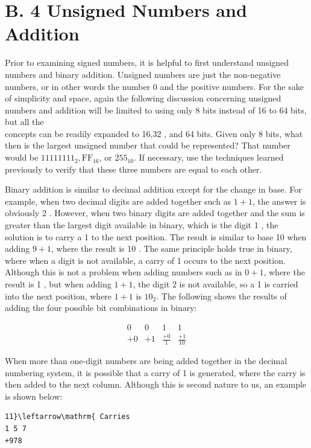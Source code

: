 \documentclass[10pt]{article}
\begin{document}
\section*{B. 4 Unsigned Numbers and Addition}
Prior to examining signed numbers, it is helpful to first understand unsigned numbers and binary addition. Unsigned numbers are just the non-negative numbers, or in other words the number 0 and the positive numbers. For the sake of simplicity and space, again the following discussion concerning unsigned numbers and addition will be limited to using only 8 bits instead of 16 to 64 bits, but all the\\
concepts can be readily expanded to 16,32 , and 64 bits. Given only 8 bits, what then is the largest unsigned number that could be represented? That number would be $11111111_{2}, \mathrm{FF}_{16}$, or $255_{10}$. If necessary, use the techniques learned previously to verify that these three numbers are equal to each other.

Binary addition is similar to decimal addition except for the change in base. For example, when two decimal digits are added together such as $1+1$, the answer is obviously 2 . However, when two binary digits are added together and the sum is greater than the largest digit available in binary, which is the digit 1 , the solution is to carry a 1 to the next position. The result is similar to base 10 when adding $9+1$, where the result is 10 . The same principle holds true in binary, where when a digit is not available, a carry of 1 occurs to the next position. Although this is not a problem when adding numbers such as in $0+1$, where the result is 1 , but when adding $1+1$, the digit 2 is not available, so a 1 is carried into the next position, where $1+1$ is $10_{2}$. The following shows the results of adding the four possible bit combinations in binary:

$$
\begin{array}{rrrr}
0 & 0 & 1 & 1 \\
+0 & +1 & \frac{+0}{1} & \frac{+1}{10}
\end{array}
$$

When more than one-digit numbers are being added together in the decimal numbering system, it is possible that a carry of 1 is generated, where the carry is then added to the next column. Although this is second nature to us, an example is shown below:

\begin{verbatim}
11}\leftarrow\mathrm{ Carries
1 5 7
+978
\end{verbatim}
\end{document}

